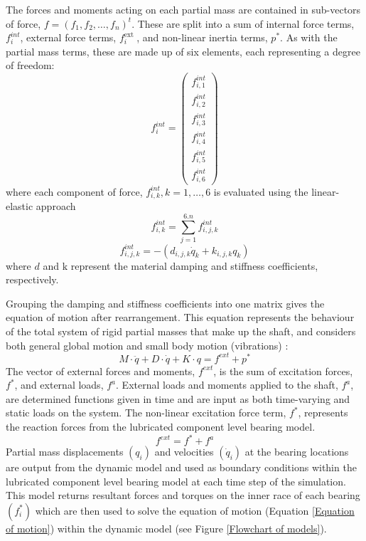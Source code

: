 The forces and moments acting on each partial mass are contained in sub-vectors of force, $f=\left(f_1, f_2, \ldots, f_n\right)^t$. These are split into a sum of internal force terms, $f_i^{i n t}$, external force terms, $f_i^{\text {ext }}$, and non-linear inertia terms, $p^*$. As with the partial mass terms, these are made up of six elements, each representing a degree of freedom:
\begin{equation}\label{Partial mass force}
	f_i^{i n t}=\left(\begin{array}{c}
		f_{i, 1}^{i n t} \\
		f_{i, 2}^{i n t} \\
		f_{i, 3}^{i n t} \\
		f_{i, 4}^{i n t} \\
		f_{i, 5}^{i n t} \\
		f_{i, 6}^{i n t}
	\end{array}\right)
\end{equation}
where each component of force, $f_{i, k}^{i n t}, k=1, \ldots, 6$ is evaluated using the linear-elastic approach
\begin{equation}\label{Partial mass force 6 dof}
	f_{i, k}^{i n t}=\sum_{j=1}^{6 . n} f_{i, j, k}^{i n t}
\end{equation}
\begin{equation}\label{Partial mass force 6 dof terms}
	f_{i, j, k}^{i n t}=-\left(d_{i, j, k} \dot{q}_k+k_{i, j, k} q_k\right)
\end{equation}
where $d$ and $\mathrm{k}$ represent the material damping and stiffness coefficients, respectively.

Grouping the damping and stiffness coefficients into one matrix gives the equation of motion after rearrangement. This equation represents the behaviour of the total system of rigid partial masses that make up the shaft, and considers both general global motion and small body motion (vibrations) \cite{Offner2011}:
\begin{equation}\label{Equation of motion}
	M \cdot \ddot{q}+D \cdot \dot{q}+K \cdot q=f^{e x t}+p^*
\end{equation}
The vector of external forces and moments, $f^{e x t}$, is the sum of excitation forces, $f^*$, and external loads, $f^a$. External loads and moments applied to the shaft, $f^a$, are determined functions given in time and are input as both time-varying and static loads on the system. The non-linear excitation force term, $f^*$, represents the reaction forces from the lubricated component level bearing model.
\begin{equation}\label{External forces}
	f^{e x t}=f^*+f^a
\end{equation}
Partial mass displacements $\left(q_i\right)$ and velocities $\left(\dot{q}_i\right)$ at the bearing locations are output from the dynamic model and used as boundary conditions within the lubricated component level bearing model at each time step of the simulation. This model returns resultant forces and torques on the inner race of each bearing $\left(f_i^*\right)$ which are then used to solve the equation of motion (Equation \ref{Equation of motion}) within the dynamic model (see Figure \ref{Flowchart of models}).

